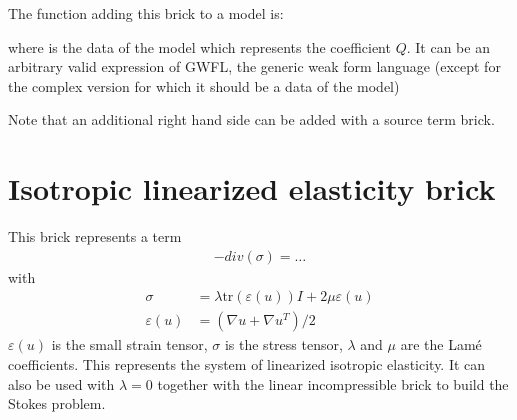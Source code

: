 \documentclass[a4paper,11pt,english]{sphinxmanual}
\begin{document}
The function adding this brick to a model is:

\begin{sphinxVerbatim}[commandchars=\\\{\}]
    
\end{sphinxVerbatim}

where  is the data of the model which represents the coefficient
\(Q\).  It can be an arbitrary valid expression of GWFL, the generic weak form language (except for the complex version for which it should be a data of the model)

Note that an additional right hand side can be added with a source term brick.

\ignorespaces 

\section{Isotropic linearized elasticity brick}
\label{\detokenize{userdoc/model_linear_elasticity:isotropic-linearized-elasticity-brick}}\label{\detokenize{userdoc/model_linear_elasticity:ud-model-linear-elasticity}}\label{\detokenize{userdoc/model_linear_elasticity:index-0}}\label{\detokenize{userdoc/model_linear_elasticity::doc}}
This brick represents a term
\begin{equation*}
\begin{split}-div(\sigma) = \ldots\end{split}
\end{equation*}
with
\begin{equation*}
\begin{split}\sigma &= \lambda\mbox{tr}(\varepsilon(u))I + 2\mu\varepsilon(u) \\
\varepsilon(u) &= (\nabla u + \nabla u^T)/2\end{split}
\end{equation*}
\(\varepsilon(u)\) is the small strain tensor, \(\sigma\) is the stress
tensor, \(\lambda\) and \(\mu\) are the Lamé coefficients. This represents
the system of linearized isotropic elasticity. It can also be used with
\(\lambda=0\) together with the linear incompressible brick to build the
Stokes problem.
\end{document}
